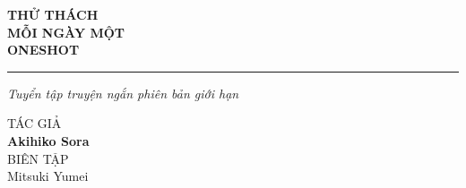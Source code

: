\thispagestyle{empty}

\vspace*{3cm}

\begin{flushleft}
    {\titlefont\fontsize{32}{36}\selectfont\bfseries\textcolor{sakura_dark}{
            THỬ THÁCH\\[0.2cm]
            MỖI NGÀY MỘT\\[0.2cm]
            ONESHOT
        }}

    \vspace{0.8cm}

    \textcolor{sakura_dark}{\rule{0.6\textwidth}{1pt}}

    \vspace{0.8cm}

    {\large\itshape\textcolor{bunko_gray}{Tuyển tập truyện ngắn phiên bản giới hạn}}
\end{flushleft}

\vfill

\begin{flushright}
    {\small TÁC GIẢ}\\[0.1cm]
    {\Large\bfseries\textcolor{sakura_dark}{Akihiko Sora}}\\[0.5cm]

    {\small BIÊN TẬP}\\[0.1cm]
    {\large Mitsuki Yumei}
\end{flushright}

\vspace*{1.5cm}
\clearpage